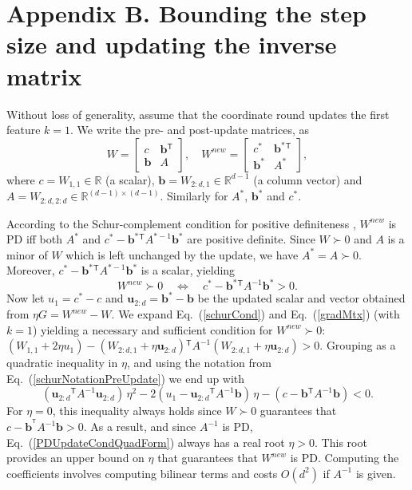 \documentclass[twoside,11pt]{article}
\newcommand\mat[1]{{#1}}
\renewcommand\vec[1]{\mathbf{#1}}
\newcommand{\T}{{}^\mathsf{T}}
\newcommand{\W}{\mat{W}}
\newcommand{\newW}{{\mat{W^{new}}}}
\newcommand{\R}{\mathbb{R}}
\newcommand{\B}{\vec{b}}
\newcommand{\C}{c}
\newcommand{\invA}{A^{-1}}
\newcommand{\uscalar}{{u}_{1}}
\newcommand{\uvec}{\vec{u}_{2:d}}
\newcommand{\Wvec}{\W_{2:d,1}}
\newcommand{\Wscalar}{\W_{1,1}}
\renewcommand{\eqref}[1]{Eq.~(\ref{#1})}
\begin{document}
\section*{Appendix B. Bounding the step size and updating the inverse matrix}
\label{appendix-inverse}
Without loss of generality, assume that the coordinate round updates the first feature $k = 1$. We write the pre- and post-update matrices, as
\begin{equation}
  \W = \left[ \begin{matrix} \C & \B\T \\ \B & A \end{matrix} \right],
  \quad
  \newW = \left[ \begin{matrix} \C^* & \B^*\T \\ \B^* & A^* \end{matrix} \right],
  \label{schurNotationPreUpdate}
\end{equation}
 where $\C = \Wscalar \in \R$ (a scalar), $\B = \Wvec \in \R^{d-1}$ (a column vector) and $A = \W_{2:d,2:d} \in \R^{(d-1) \times (d-1)}$. Similarly for $A^*$, $\B^*$ and $\C^*$.

According to the Schur-complement condition for positive definiteness
\citep[p. 650]{boyd2004convex}, $\newW$ is PD iff both
$A^*$ and $\C^* - \B^*\T A^{*-1} \B^*$ are positive definite.
Since $W \succ 0$ and $A$ is a minor of $\W$ which is left unchanged by the update, we have $A^* =
A \succ 0$. Moreover, $\C^* - \B^*\T A^{*-1} \B^*$ is a
scalar, yielding
\begin{equation}
  \newW \succ  0 \quad \Leftrightarrow \quad  \C^* - \B^*\T \invA \B^* >  0.
  \label{schurCond}
\end{equation}
Now let $\uscalar = \C^* - \C$ and $\uvec = \B^* - \B$ be the updated scalar and vector
obtained from $\eta G = \newW - \W$. We expand \eqref{schurCond} and
\eqref{gradMtx} (with $k=1$) yielding a necessary and sufficient condition for $\newW \succ 0$: $(\Wscalar + 2\eta \uscalar)-(\Wvec + \eta \uvec)\T \invA (\Wvec + \eta \uvec)   > 0$.
Grouping as a quadratic inequality in $\eta$, and using the notation from \eqref{schurNotationPreUpdate} we end up with
\begin{equation}
\label{PDUpdateCondQuadForm}
(\uvec\T \invA \uvec) \, \eta^2 
-2(\uscalar - \uvec\T \invA \B) \,\eta 
-(\C - \B\T  \invA \B) < 0 .
\end{equation}
For $\eta = 0$, this inequality always holds since $\W \succ 0$ guarantees that $\C-\B^{\T} \invA \B >0$. As a result, and since $\invA$ is PD, \eqref{PDUpdateCondQuadForm} always has a real
root $\eta > 0$. This root provides an upper bound on $\eta$ that guarantees that $\newW$ is PD. Computing the coefficients involves computing bilinear terms and costs $O(d^2)$ if $\invA$ is given.
\end{document}
